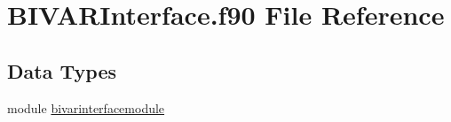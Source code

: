 \hypertarget{BIVARInterface_8f90}{\section{B\+I\+V\+A\+R\+Interface.\+f90 File Reference}
\label{BIVARInterface_8f90}
}
\subsection*{Data Types}
\begin{DoxyCompactItemize}
\item 
module \hyperlink{classbivarinterfacemodule}{bivarinterfacemodule}
\end{DoxyCompactItemize}
